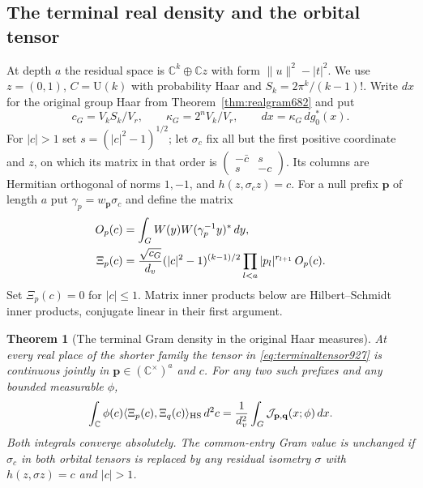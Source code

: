 \documentclass[a4paper,11pt]{article}
\newtheorem{theorem}[proposition]{Theorem}
\theoremstyle{definition}
\theoremstyle{remark}
\numberwithin{equation}{section}
\begin{document}
\subsection{The terminal real density and the orbital tensor}
\label{sec:terminaltensor927}

At depth \(a\) the residual space is \(\mathbb C^k\oplus\mathbb C z\)
with form \(\|u\|^2-|t|^2\). We use \(z=(0,1)\),
\(C=\mathrm U(k)\) with probability Haar and
\(S_k=2\pi^k/(k-1)!\). Write \(dx\) for the original group
Haar from Theorem~\ref{thm:realgram682} and put
\[
  c_G=V_k S_k/V_r,\qquad
  \kappa_G=2^n V_k/V_r,\qquad dx=\kappa_G\,dg_0^*(x).
\]
For \(|c|>1\) set \(s=(|c|^2-1)^{1/2}\); let \(\sigma_c\)
fix all but the first positive coordinate and \(z\), on which
its matrix in that order is
\(\left(\begin{smallmatrix}-\bar c&s\\s&-c\end{smallmatrix}\right)\).
Its columns are Hermitian orthogonal of norms \(1,-1\), and
\(h(z,\sigma_c z)=c\). For a null prefix \(\mathbf p\) of
length \(a\) put \(\gamma_p=w_{\mathbf p}\sigma_c\) and define
the matrix
\begin{align}
 O_p(c)&=\int_G W(y) W(\gamma_p^{-1}y)^*\,dy,\notag\\
 \Xi_p(c)&=\frac{\sqrt{c_G}}{d_v}(|c|^2-1)^{(k-1)/2}
          \prod_{l<a}|p_l|^{r_{l+1}}\,O_p(c).
 \label{eq:terminaltensor927}
\end{align}
Set \(\Xi_p(c)=0\) for \(|c|\le1\). Matrix inner products below
are Hilbert--Schmidt inner products, conjugate linear in their
first argument.

\begin{theorem}[The terminal Gram density in the original Haar measures]
\leavevmode\label{thm:terminaltensor927}
At every real place of the shorter family the tensor in
\eqref{eq:terminaltensor927} is continuous jointly in
\(\mathbf p\in(\mathbb C^\times)^a\) and \(c\).
For any two such prefixes and any bounded measurable \(\phi\),
\begin{equation}
 \int_{\mathbb C}\phi(c)\langle\Xi_p(c),\Xi_q(c)\rangle_{\rm HS}\,d^2c
 =\frac1{d_v^2}\int_G\mathcal J_{\mathbf p,\mathbf q}(x;\phi)\,dx .
 \label{eq:terminaldescent927}
\end{equation}
Both integrals converge absolutely. The common-entry Gram value
is unchanged if \(\sigma_c\) in both orbital tensors is replaced
by any residual isometry \(\sigma\) with \(h(z,\sigma z)=c\)
and \(|c|>1\).
\end{theorem}
\end{document}
